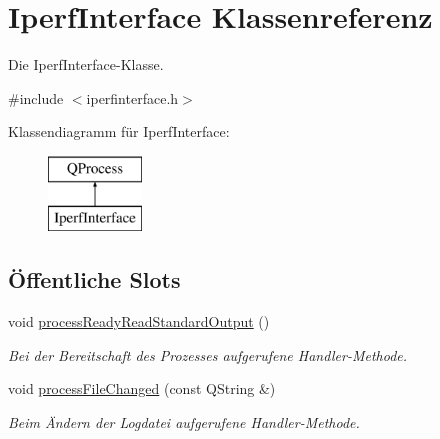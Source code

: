 \hypertarget{class_iperf_interface}{}\section{Iperf\+Interface Klassenreferenz}
\label{class_iperf_interface}


Die Iperf\+Interface-\/\+Klasse.  




{\ttfamily \#include $<$iperfinterface.\+h$>$}

Klassendiagramm für Iperf\+Interface\+:\begin{figure}[H]
\begin{center}
\leavevmode
\includegraphics[height=2.000000cm]{class_iperf_interface}
\end{center}
\end{figure}
\subsection*{Öffentliche Slots}
\begin{DoxyCompactItemize}
\item 
\hypertarget{class_iperf_interface_a28845faae84e19418b0c2006785d93a7}{}\label{class_iperf_interface_a28845faae84e19418b0c2006785d93a7} 
void \hyperlink{class_iperf_interface_a28845faae84e19418b0c2006785d93a7}{process\+Ready\+Read\+Standard\+Output} ()
\begin{DoxyCompactList}\small\item\em Bei der Bereitschaft des Prozesses aufgerufene Handler-\/\+Methode. \end{DoxyCompactList}\item 
\hypertarget{class_iperf_interface_a9d82924212dac8a3cdd5ac074a99ec88}{}\label{class_iperf_interface_a9d82924212dac8a3cdd5ac074a99ec88} 
void \hyperlink{class_iperf_interface_a9d82924212dac8a3cdd5ac074a99ec88}{process\+File\+Changed} (const Q\+String \&)
\begin{DoxyCompactList}\small\item\em Beim Ändern der Logdatei aufgerufene Handler-\/\+Methode. \end{DoxyCompactList}\end{DoxyCompactItemize}
